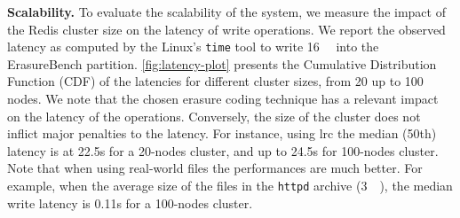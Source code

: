 %

\textbf{Scalability.}
\label{subsec:latency}
To evaluate the scalability of the system, we measure the impact of the Redis cluster size on the latency of write operations.
We report the observed latency as computed by the Linux's \texttt{time} tool to write \SI{16}{\mebi\byte} into the ErasureBench partition.
\autoref{fig:latency-plot} presents the Cumulative Distribution Function (CDF) of the latencies for different cluster sizes, from 20 up to 100 nodes.
We note that the chosen erasure coding technique has a relevant impact on the latency of the operations. 
Conversely, the size of the cluster does not inflict major penalties to the latency.
For instance, using \ac{lrc} the median (50th) latency is at 22.5s for a 20-nodes cluster, and up to 24.5s for 100-nodes cluster. 
Note that when using real-world files the performances are much better.
For example, when the average size of the files in the \texttt{httpd} archive (\SI{3}{\kibi\byte}), the median write latency is 0.11s for a 100-nodes cluster. 


